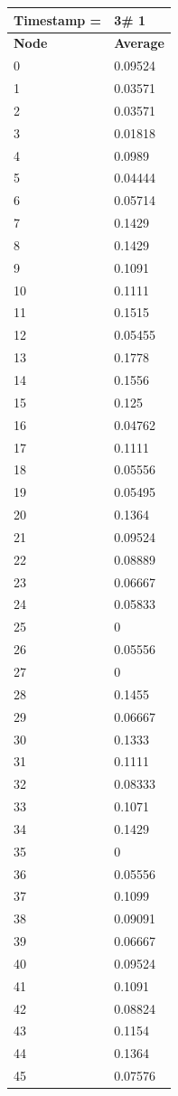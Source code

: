 \begin{tabular}{|l||l|}
\hline
\textbf{Timestamp =} & \textbf{3}\# 1\\\hline
	\textbf{Node} & \textbf{Average} \\ \hline
\hline
	0 & 0.09524 \\ \hline
	1 & 0.03571 \\ \hline
	2 & 0.03571 \\ \hline
	3 & 0.01818 \\ \hline
	4 & 0.0989 \\ \hline
	5 & 0.04444 \\ \hline
	6 & 0.05714 \\ \hline
	7 & 0.1429 \\ \hline
	8 & 0.1429 \\ \hline
	9 & 0.1091 \\ \hline
	10 & 0.1111 \\ \hline
	11 & 0.1515 \\ \hline
	12 & 0.05455 \\ \hline
	13 & 0.1778 \\ \hline
	14 & 0.1556 \\ \hline
	15 & 0.125 \\ \hline
	16 & 0.04762 \\ \hline
	17 & 0.1111 \\ \hline
	18 & 0.05556 \\ \hline
	19 & 0.05495 \\ \hline
	20 & 0.1364 \\ \hline
	21 & 0.09524 \\ \hline
	22 & 0.08889 \\ \hline
	23 & 0.06667 \\ \hline
	24 & 0.05833 \\ \hline
	25 & 0 \\ \hline
	26 & 0.05556 \\ \hline
	27 & 0 \\ \hline
	28 & 0.1455 \\ \hline
	29 & 0.06667 \\ \hline
	30 & 0.1333 \\ \hline
	31 & 0.1111 \\ \hline
	32 & 0.08333 \\ \hline
	33 & 0.1071 \\ \hline
	34 & 0.1429 \\ \hline
	35 & 0 \\ \hline
	36 & 0.05556 \\ \hline
	37 & 0.1099 \\ \hline
	38 & 0.09091 \\ \hline
	39 & 0.06667 \\ \hline
	40 & 0.09524 \\ \hline
	41 & 0.1091 \\ \hline
	42 & 0.08824 \\ \hline
	43 & 0.1154 \\ \hline
	44 & 0.1364 \\ \hline
	45 & 0.07576 \\ \hline
\end{tabular}

